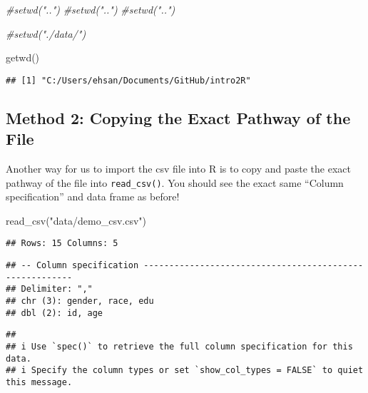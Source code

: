 \documentclass[
]{book}
\newenvironment{Shaded}{\begin{snugshade}}{\end{snugshade}}
\newcommand{\CommentTok}[1]{\textcolor[rgb]{0.56,0.35,0.01}{\textit{#1}}}
\newcommand{\FunctionTok}[1]{\textcolor[rgb]{0.00,0.00,0.00}{#1}}
\newcommand{\NormalTok}[1]{#1}
\newcommand{\StringTok}[1]{\textcolor[rgb]{0.31,0.60,0.02}{#1}}
\begin{document}
\begin{Shaded}
\begin{Highlighting}[]
\CommentTok{\#setwd("..")}
\CommentTok{\#setwd("..") }
\CommentTok{\#setwd("..")}


\CommentTok{\#setwd("./data/")}
\end{Highlighting}
\end{Shaded}

\begin{Shaded}
\begin{Highlighting}[]
\FunctionTok{getwd}\NormalTok{()}
\end{Highlighting}
\end{Shaded}

\begin{verbatim}
## [1] "C:/Users/ehsan/Documents/GitHub/intro2R"
\end{verbatim}

\hypertarget{method-2-copying-the-exact-pathway-of-the-file}{%
\subsection{Method 2: Copying the Exact Pathway of the File}\label{method-2-copying-the-exact-pathway-of-the-file}}

Another way for us to import the csv file into R is to copy and paste the exact pathway of the file into \texttt{read\_csv()}. You should see the exact same ``Column specification'' and data frame as before!

\begin{Shaded}
\begin{Highlighting}[]
\FunctionTok{read\_csv}\NormalTok{(}\StringTok{"data/demo\_csv.csv"}\NormalTok{)}
\end{Highlighting}
\end{Shaded}

\begin{verbatim}
## Rows: 15 Columns: 5
\end{verbatim}

\begin{verbatim}
## -- Column specification --------------------------------------------------------
## Delimiter: ","
## chr (3): gender, race, edu
## dbl (2): id, age
\end{verbatim}

\begin{verbatim}
## 
## i Use `spec()` to retrieve the full column specification for this data.
## i Specify the column types or set `show_col_types = FALSE` to quiet this message.
\end{verbatim}
\end{document}

